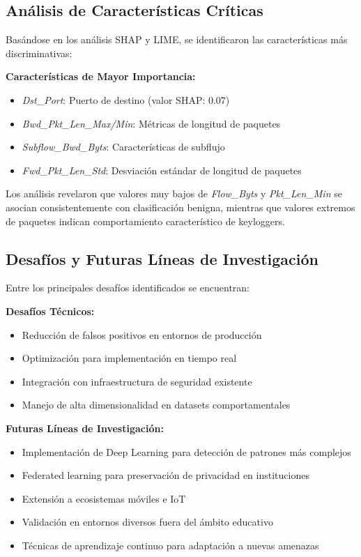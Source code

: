 \documentclass[conference]{IEEEtran}
\begin{document}
\subsection{Análisis de Características Críticas}
Basándose en los análisis SHAP y LIME, se identificaron las características más discriminativas:

\textbf{Características de Mayor Importancia:}
\begin{itemize}
    \item \textit{Dst\_Port}: Puerto de destino (valor SHAP: 0.07)
    \item \textit{Bwd\_Pkt\_Len\_Max/Min}: Métricas de longitud de paquetes
    \item \textit{Subflow\_Bwd\_Byts}: Características de subflujo
    \item \textit{Fwd\_Pkt\_Len\_Std}: Desviación estándar de longitud de paquetes
\end{itemize}

Los análisis revelaron que valores muy bajos de \textit{Flow\_Byts} y \textit{Pkt\_Len\_Min} se asocian consistentemente con clasificación benigna, mientras que valores extremos de paquetes indican comportamiento característico de keyloggers.

\subsection{Desafíos y Futuras Líneas de Investigación}
Entre los principales desafíos identificados se encuentran:

\textbf{Desafíos Técnicos:}
\begin{itemize}
    \item Reducción de falsos positivos en entornos de producción
    \item Optimización para implementación en tiempo real
    \item Integración con infraestructura de seguridad existente
    \item Manejo de alta dimensionalidad en datasets comportamentales
\end{itemize}

\textbf{Futuras Líneas de Investigación:}
\begin{itemize}
    \item Implementación de Deep Learning para detección de patrones más complejos
    \item Federated learning para preservación de privacidad en instituciones
    \item Extensión a ecosistemas móviles e IoT
    \item Validación en entornos diversos fuera del ámbito educativo
    \item Técnicas de aprendizaje continuo para adaptación a nuevas amenazas
\end{itemize}
\end{document}

